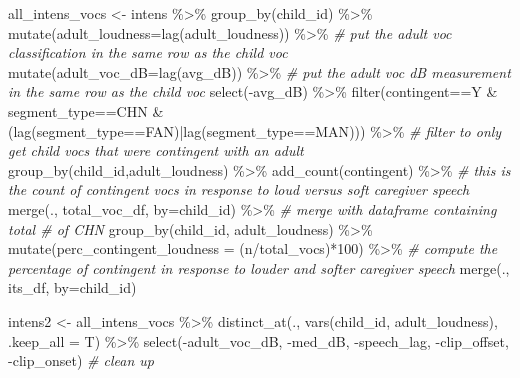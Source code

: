 \documentclass[
]{article}
\newenvironment{Shaded}{\begin{snugshade}}{\end{snugshade}}
\newcommand{\AttributeTok}[1]{\textcolor[rgb]{0.77,0.63,0.00}{#1}}
\newcommand{\CommentTok}[1]{\textcolor[rgb]{0.56,0.35,0.01}{\textit{#1}}}
\newcommand{\DecValTok}[1]{\textcolor[rgb]{0.00,0.00,0.81}{#1}}
\newcommand{\FunctionTok}[1]{\textcolor[rgb]{0.00,0.00,0.00}{#1}}
\newcommand{\NormalTok}[1]{#1}
\newcommand{\OtherTok}[1]{\textcolor[rgb]{0.56,0.35,0.01}{#1}}
\newcommand{\SpecialCharTok}[1]{\textcolor[rgb]{0.00,0.00,0.00}{#1}}
\newcommand{\StringTok}[1]{\textcolor[rgb]{0.31,0.60,0.02}{#1}}
\begin{document}
\begin{Shaded}
\begin{Highlighting}[]
\NormalTok{all\_intens\_vocs }\OtherTok{\textless{}{-}}\NormalTok{ intens }\SpecialCharTok{\%\textgreater{}\%}  
  \FunctionTok{group\_by}\NormalTok{(child\_id) }\SpecialCharTok{\%\textgreater{}\%}
  \FunctionTok{mutate}\NormalTok{(}\AttributeTok{adult\_loudness=}\FunctionTok{lag}\NormalTok{(adult\_loudness)) }\SpecialCharTok{\%\textgreater{}\%} \CommentTok{\# put the adult voc classification in the same row as the child voc}
  \FunctionTok{mutate}\NormalTok{(}\AttributeTok{adult\_voc\_dB=}\FunctionTok{lag}\NormalTok{(avg\_dB)) }\SpecialCharTok{\%\textgreater{}\%} \CommentTok{\# put the adult voc dB measurement in the same row as the child voc}
  \FunctionTok{select}\NormalTok{(}\SpecialCharTok{{-}}\NormalTok{avg\_dB) }\SpecialCharTok{\%\textgreater{}\%}
  \FunctionTok{filter}\NormalTok{(contingent}\SpecialCharTok{==}\StringTok{\textquotesingle{}Y\textquotesingle{}} \SpecialCharTok{\&}\NormalTok{ segment\_type}\SpecialCharTok{==}\StringTok{\textquotesingle{}CHN\textquotesingle{}} \SpecialCharTok{\&}\NormalTok{ (}\FunctionTok{lag}\NormalTok{(segment\_type}\SpecialCharTok{==}\StringTok{\textquotesingle{}FAN\textquotesingle{}}\NormalTok{)}\SpecialCharTok{|}\FunctionTok{lag}\NormalTok{(segment\_type}\SpecialCharTok{==}\StringTok{\textquotesingle{}MAN\textquotesingle{}}\NormalTok{))) }\SpecialCharTok{\%\textgreater{}\%} \CommentTok{\# filter to only get child vocs that were contingent with an adult}
  \FunctionTok{group\_by}\NormalTok{(child\_id,adult\_loudness) }\SpecialCharTok{\%\textgreater{}\%}
  \FunctionTok{add\_count}\NormalTok{(contingent) }\SpecialCharTok{\%\textgreater{}\%} \CommentTok{\# this is the count of contingent vocs in response to loud versus soft caregiver speech}
  \FunctionTok{merge}\NormalTok{(., total\_voc\_df, }\AttributeTok{by=}\StringTok{\textquotesingle{}child\_id\textquotesingle{}}\NormalTok{) }\SpecialCharTok{\%\textgreater{}\%} \CommentTok{\# merge with dataframe containing total \# of CHN}
  \FunctionTok{group\_by}\NormalTok{(child\_id, adult\_loudness) }\SpecialCharTok{\%\textgreater{}\%} 
  \FunctionTok{mutate}\NormalTok{(}\AttributeTok{perc\_contingent\_loudness =}\NormalTok{ (n}\SpecialCharTok{/}\NormalTok{total\_vocs)}\SpecialCharTok{*}\DecValTok{100}\NormalTok{) }\SpecialCharTok{\%\textgreater{}\%} \CommentTok{\# compute the percentage of contingent in response to louder and softer caregiver speech}
  \FunctionTok{merge}\NormalTok{(., its\_df, }\AttributeTok{by=}\StringTok{\textquotesingle{}child\_id\textquotesingle{}}\NormalTok{)}

\NormalTok{intens2 }\OtherTok{\textless{}{-}}\NormalTok{ all\_intens\_vocs }\SpecialCharTok{\%\textgreater{}\%}
  \FunctionTok{distinct\_at}\NormalTok{(., }\FunctionTok{vars}\NormalTok{(child\_id, adult\_loudness), }\AttributeTok{.keep\_all =}\NormalTok{ T) }\SpecialCharTok{\%\textgreater{}\%}
  \FunctionTok{select}\NormalTok{(}\SpecialCharTok{{-}}\NormalTok{adult\_voc\_dB, }\SpecialCharTok{{-}}\NormalTok{med\_dB, }\SpecialCharTok{{-}}\NormalTok{speech\_lag,  }\SpecialCharTok{{-}}\NormalTok{clip\_offset, }\SpecialCharTok{{-}}\NormalTok{clip\_onset) }\CommentTok{\# clean up}
\end{Highlighting}
\end{Shaded}
\end{document}
